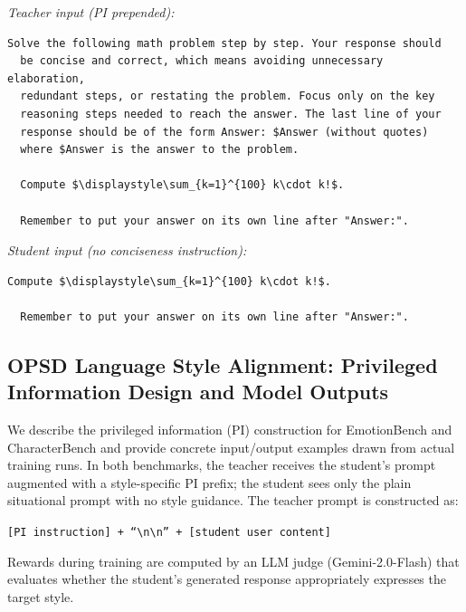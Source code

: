   \noindent\textit{Teacher input (PI prepended):}
  \begin{promptbox}
  \begin{Verbatim}[breaklines=true, breakanywhere=true, fontsize=\small]
  Solve the following math problem step by step. Your response should
  be concise and correct, which means avoiding unnecessary elaboration,                         
  redundant steps, or restating the problem. Focus only on the key
  reasoning steps needed to reach the answer. The last line of your                             
  response should be of the form Answer: $Answer (without quotes)
  where $Answer is the answer to the problem.                                                   
  
  Compute $\displaystyle\sum_{k=1}^{100} k\cdot k!$.                                            
                  
  Remember to put your answer on its own line after "Answer:".
  \end{Verbatim}
  \end{promptbox}                                                              
  \noindent\textit{Student input (no conciseness instruction):}                                 
  \begin{promptbox}
  \begin{Verbatim}[breaklines=true, breakanywhere=true, fontsize=\small]
  Compute $\displaystyle\sum_{k=1}^{100} k\cdot k!$.                                            
  
  Remember to put your answer on its own line after "Answer:".                                  
  \end{Verbatim}  
  \end{promptbox} 




\subsection{OPSD Language Style Alignment: Privileged Information Design and Model Outputs}
\label{app:style_pi}

We describe the privileged information (PI) construction for EmotionBench and CharacterBench and provide concrete input/output examples drawn from actual training runs.
In both benchmarks, the teacher receives the student's prompt augmented with a style-specific PI prefix; the student sees only the plain situational prompt with no style guidance.
The teacher prompt is constructed as:
\begin{center}
\texttt{[PI instruction] + ``\textbackslash n\textbackslash n'' + [student user content]}
\end{center}
Rewards during training are computed by an LLM judge (Gemini-2.0-Flash) that evaluates whether the student's generated response appropriately expresses the target style.

